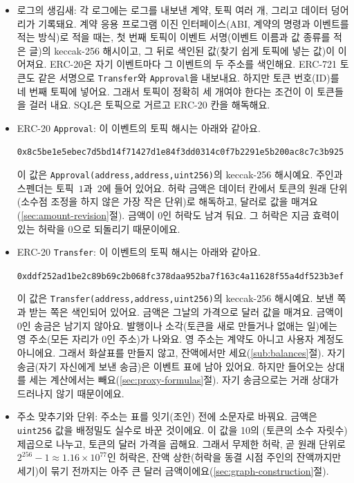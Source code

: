 \begin{itemize}
\item 로그의 생김새: 각 로그에는 로그를 내보낸 계약, 토픽 여러 개, 그리고 데이터 덩어리가 기록돼요\parencite{wood2025yellowpaper}. 계약 응용 프로그램 이진 인터페이스(ABI, 계약의 명령과 이벤트를 적는 방식)로 적을 때는, 첫 번째 토픽이 이벤트 서명(이벤트 이름과 값 종류를 적은 글)의 keccak-256 해시이고, 그 뒤로 색인된 값(찾기 쉽게 토픽에 넣는 값)이 이어져요\parencite{soliditynddocsabi}. ERC-20은 자기 이벤트마다 그 이벤트의 두 주소를 색인해요\parencite{vogelsteller2015erc20}. ERC-721 토큰도 같은 서명으로 \texttt{Transfer}와 \texttt{Approval}을 내보내요. 하지만 토큰 번호(ID)를 네 번째 토픽에 넣어요. 그래서 토픽이 정확히 세 개여야 한다는 조건이 이 토큰들을 걸러 내요. SQL은 토픽으로 거르고 ERC-20 칸을 해독해요.

\item ERC-20 \texttt{Approval}: 이 이벤트의 토픽 해시는 아래와 같아요.
\begin{center}
\texttt{0x8c5be1e5ebec7d5bd14f71427d1e84f3dd0314c0f7b2291e5b200ac8c7c3b925}
\end{center}
이 값은 \texttt{Approval(address,address,uint256)}의 keccak-256 해시예요. 주인과 스펜더는 토픽~$1$과~$2$에 들어 있어요. 허락 금액은 데이터 칸에서 토큰의 원래 단위(소수점 조정을 하지 않은 가장 작은 단위)로 해독하고, 달러로 값을 매겨요(\ref{sec:amount-revision}절). 금액이 0인 허락도 남겨 둬요. 그 허락은 지금 효력이 있는 허락을 0으로 되돌리기 때문이에요.

\item ERC-20 \texttt{Transfer}: 이 이벤트의 토픽 해시는 아래와 같아요.
\begin{center}
\texttt{0xddf252ad1be2c89b69c2b068fc378daa952ba7f163c4a11628f55a4df523b3ef}
\end{center}
이 값은 \texttt{Transfer(address,address,uint256)}의 keccak-256 해시예요. 보낸 쪽과 받는 쪽은 색인되어 있어요. 금액은 그날의 가격으로 달러 값을 매겨요. 금액이 0인 송금은 남기지 않아요. 발행이나 소각(토큰을 새로 만들거나 없애는 일)에는 영 주소(모든 자리가 0인 주소)가 나와요. 영 주소는 계약도 아니고 사용자 계정도 아니에요. 그래서 화살표를 만들지 않고, 잔액에서만 세요(\ref{sub:balances}절). 자기 송금(자기 자신에게 보낸 송금)은 이벤트 표에 남아 있어요. 하지만 들어오는 상대를 세는 계산에서는 빼요(\ref{sec:proxy-formulas}절). 자기 송금으로는 거래 상대가 드러나지 않기 때문이에요.

\item 주소 맞추기와 단위: 주소는 표를 잇기(조인) 전에 소문자로 바꿔요. 금액은 \texttt{uint256} 값을 배정밀도 실수로 바꾼 것이에요. 이 값을 10의 (토큰의 소수 자릿수)제곱으로 나누고, 토큰의 달러 가격을 곱해요. 그래서 무제한 허락, 곧 원래 단위로 $2^{256}-1\approx1.16\times10^{77}$인 허락은, 잔액 상한(허락을 동결 시점 주인의 잔액까지만 세기)이 묶기 전까지는 아주 큰 달러 금액이에요(\ref{sec:graph-construction}절).

\end{itemize}

